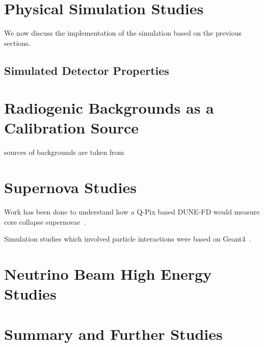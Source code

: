 \section{Physical Simulation Studies}

We now discuss the implementation of the simulation based on the previous sections.


\subsection{Simulated Detector Properties}


\section{Radiogenic Backgrounds as a Calibration Source}

sources of backgrounds are taken from~\citep{DUNE-FD_TDRv4:Abi_2020}


\section{Supernova Studies}

Work has been done to understand how a Q-Pix based DUNE-FD would measure core collapse supernovae~\citep{qpix:shion}.

Simulation studies which involved particle interactions were based on Geant4~\citep{geant4:AGOSTINELLI2003250}.


\section{Neutrino Beam High Energy Studies}

\section{Summary and Further Studies}
